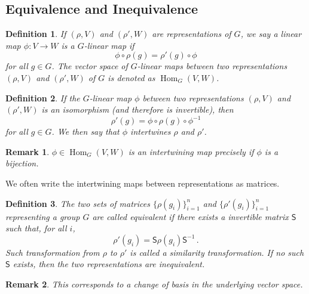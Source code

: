 \documentclass{article}
\theoremstyle{plain}\theoremheaderfont{\normalfont\itshape}\theorembodyfont{\rmfamily}\theoremseparator{.}\newtheorem*{rem}{Remark}\newtheorem*{ex}{Example}\newtheorem*{proof}{Proof}\newtheorem*{altp}{Alternative proof}
\theoremstyle{plain}\theoremheaderfont{\normalfont\bfseries}\theorembodyfont{\rmfamily}\theoremseparator{.}\newtheorem{thm}{Theorem}[section]\newtheorem{lem}[thm]{Lemma}\newtheorem{prop}[thm]{Proposition}\newtheorem*{cor}{Corollary}\newtheorem{defn}[thm]{Definition}\newtheorem{clm}[thm]{Claim}\newtheorem{clminproof}{Claim}
\theoremstyle{break}\theoremheaderfont{\normalfont\itshape}\theorembodyfont{\rmfamily}\theoremseparator{.\medskip}\newtheorem*{proofskip}{Proof}\newtheorem*{exs}{Examples}\newtheorem*{rems}{Remarks}
\theoremstyle{break}\theoremheaderfont{\normalfont\bfseries}\theorembodyfont{\rmfamily}\theoremseparator{.\medskip}\newtheorem{lemskip}[thm]{Lemma}\newtheorem{defnskip}[thm]{Definition}\newtheorem{propskip}[thm]{Proposition}\newtheorem{thmskip}[thm]{Theorem}
\numberwithin{equation}{section}
\DeclareMathOperator{\Hom}{Hom}
\begin{document}
	\subsection{Equivalence and Inequivalence}
	\begin{defn}
		If \((\rho,V)\) and \((\rho', W)\) are representations of \(G\), we say a linear map \(\phi:V\to W\) is a \textit{\(G\)-linear map} if
		\[\phi\circ\rho(g)=\rho'(g)\circ\phi\]
		for all \(g\in G\). The vector space of \(G\)-linear maps between two representations \((\rho,V)\) and \((\rho', W)\) of \(G\) is denoted as \(\Hom_G(V, W)\).
	\end{defn}
	\begin{defn}
		If the \(G\)-linear map \(\phi\) between two representations \((\rho,V)\) and \((\rho', W)\) is an isomorphism (and therefore is invertible), then
		\[\rho'(g)=\phi\circ\rho(g)\circ\phi^{-1}\]
		for all \(g\in G\). We then say that \(\phi\) \textit{intertwines} \(\rho\) and \(\rho'\).
	\end{defn}
	\begin{rem}
		\(\phi\in \Hom_G(V, W)\) is an intertwining map precisely if \(\phi\) is a bijection.
	\end{rem}
	We often write the intertwining maps between representations as matrices.
	\begin{defn}
		The two sets of matrices \(\{\rho(g_i)\}_{i=1}^n\) and \(\{\rho'(g_i)\}_{i=1}^n\) representing a group \(G\) are called \textit{equivalent} if there exists a invertible matrix \(\mathsf{S}\) such that, for all \(i\),
		\[\rho'(g_i)=\mathsf{S}\rho(g_i)\mathsf{S}^{-1}\,.\]
		Such transformation from \(\rho\) to \(\rho'\) is called a \textit{similarity transformation}. If no such \(\mathsf{S}\) exists, then the two representations are inequivalent.
	\end{defn}
	\begin{rem}
		This corresponds to a change of basis in the underlying vector space.
	\end{rem}
\end{document}
